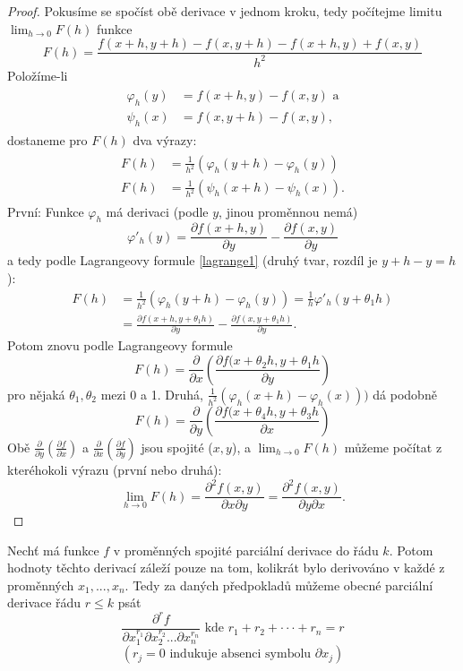 \documentclass[../main.tex]{subfiles}
\begin{document}
\begin{proof}
	Pokusíme se spočíst obě derivace v jednom kroku, tedy počítejme limitu $\lim_{h\rightarrow 0} F(h)$ funkce
	\[F(h) = \frac{f(x+h,y+h) - f(x,y+h) - f(x+h,y) + f(x,y)}{h^2}\]
	Položíme-li 
	\begin{align*} 
		\begin{split}
			\varphi_h(y) & = f(x+h,y) - f(x,y)\text{ a}\\
			\psi_h(x) & = f(x,y+h) - f(x,y),
		\end{split}
	\end{align*}
	dostaneme pro $F(h)$ dva výrazy:
	\begin{align*} 
		\begin{split}
			F(h) & = \frac{1}{h^2} (\varphi_h(y+h) - \varphi_h(y))\\
			F(h) & = \frac{1}{h^2} (\psi_h(x+h)-\psi_h(x)).
		\end{split}
	\end{align*}
	První: Funkce $\varphi_h$ má derivaci (podle $y$, jinou proměnnou nemá)
	\[\varphi'_h(y)=\frac{\partial f(x+h,y)}{\partial y}-\frac{\partial f(x,y)}{\partial y}\]
	a tedy podle Lagrangeovy formule \ref{lagrange1} (druhý tvar, rozdíl je $y + h - y = h$):
	\begin{align*}
		F(h) & = \frac{1}{h^2}(\varphi_h(y+h)-\varphi_h(y)) = \frac{1}{h}\varphi'_h(y+\theta_1h)\\
		& = \frac{\partial f(x+h,y+\theta_1h)}{\partial y} -\frac{\partial f(x,y+\theta_1h)}{\partial y}.
	\end{align*}
	Potom znovu podle Lagrangeovy formule
	\[F(h) = \frac{\partial }{\partial x}\left(\frac{\partial f(x+\theta_2h,y+\theta_1h}{\partial y}\right)\]
	pro nějaká $\theta_1,\theta_2$ mezi 0 a 1.
	Druhá, $\frac{1}{h^2}(\varphi_h(x+h) - \varphi_h(x)))$ dá podobně
	\[F(h) = \frac{\partial }{\partial y}\left(\frac{\partial f(x+\theta_4h,y + \theta_3h}{\partial x}\right)\]
	Obě $\frac{\partial }{\partial y}(\frac{\partial f}{\partial x})$ a $\frac{\partial }{\partial x}(\frac{\partial f}{\partial y})$ jsou spojité ($x,y$), a $\lim_{h\rightarrow 0} F(h)$ můžeme počítat z kteréhokoli výrazu (první nebo druhá):
	\[\lim_{h\rightarrow 0}F(h) = \frac{\partial ^2 f(x,y)}{\partial x \partial y} 
	                            = \frac{\partial ^2 f(x,y)}{\partial y \partial x}.\]
\end{proof}

\begin{consequence}
	Nechť má funkce $f$ v proměnných spojité parciální derivace do řádu $k$. Potom hodnoty těchto derivací
	záleží pouze na tom, kolikrát bylo derivováno v každé z proměnných $x_1, ... , x_n$.
	Tedy za daných předpokladů můžeme obecné parciální derivace řádu $r \leq k$ psát
	\[\frac{\partial ^r f}{\partial x^{r_1}_1 \partial x^{r_2}_2 ... \partial x_n^{r_n}} \text{ kde } r_1 + r_2 + \cdot \cdot \cdot + r_n = r \]
	\[(r_j = 0 \text{ indukuje absenci symbolu } \partial x_j)\]
\end{consequence}
\end{document}
